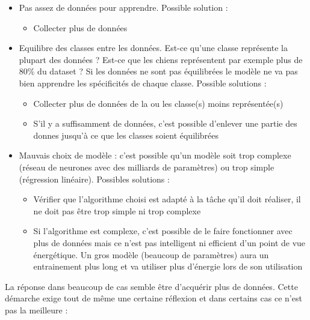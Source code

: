 \begin{itemize}
    \item Pas assez de données pour apprendre. Possible solution :
    \begin{itemize}
        \item Collecter plus de données
    \end{itemize}
    
    \item Equilibre des classes entre les données. Est-ce qu'une classe représente la plupart des données ? Est-ce que les chiens représentent par exemple plus de 80\% du dataset ? Si les données ne sont pas équilibrées le modèle ne va pas bien apprendre les spécificités de chaque classe. Possible solutions :
    \begin{itemize}
        \item Collecter plus de données de la ou les classe(s) moins représentée(s)
        \item S'il y a suffisamment de données, c'est possible d'enlever une partie des donnes jusqu'à ce que les classes soient équilibrées
    \end{itemize}
    
    \item Mauvais choix de modèle : c'est possible qu'un modèle soit trop complexe (réseau de neurones avec des milliards de paramètres) ou trop simple (régression linéaire). Possibles solutions :
    \begin{itemize}
        \item Vérifier que l'algorithme choisi est adapté à la tâche qu'il doit réaliser, il ne doit pas être trop simple ni trop complexe
        \item Si l'algorithme est complexe, c'est possible de le faire fonctionner avec plus de données mais ce n'est pas intelligent ni efficient d'un point de vue énergétique. Un gros modèle (beaucoup de paramètres) aura un entrainement plus long et va utiliser plus d'énergie lors de son utilisation
    \end{itemize}
\end{itemize}

\par{La réponse dans beaucoup de cas semble être d'acquérir plus de données. Cette démarche exige tout de même une certaine réflexion et dans certains cas ce n'est pas la meilleure :}

